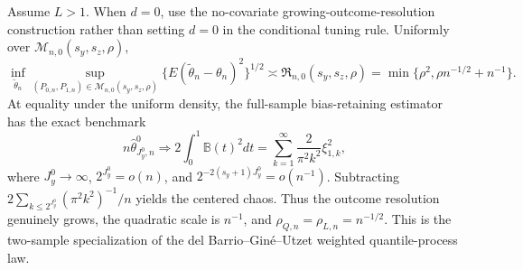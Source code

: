 Assume \(L>1\). When \(d=0\), use the no-covariate growing-outcome-resolution construction rather than setting \(d=0\) in the conditional tuning rule. Uniformly over \(\mathcal M_{n,0}(s_y,s_z,\rho)\),
\[
\inf_{\widetilde\theta_n}\sup_{(P_{0,n},P_{1,n})\in\mathcal M_{n,0}(s_y,s_z,\rho)}\{E(\widetilde\theta_n-\theta_n)^2\}^{1/2}\asymp\mathfrak R_{n,0}(s_y,s_z,\rho)=\min\{\rho^2,\rho n^{-1/2}+n^{-1}\}.
\]
At equality under the uniform density, the full-sample bias-retaining estimator has the exact benchmark
\[
n\widehat\theta^0_{J_y^0,n}\Rightarrow2\int_0^1\mathbb B(t)^2dt=\sum_{k=1}^{\infty}\frac{2}{\pi^2k^2}\xi_{1,k}^2,
\]
where \(J_y^0\to\infty\), \(2^{J_y^0}=o(n)\), and \(2^{-2(s_y+1)J_y^0}=o(n^{-1})\). Subtracting \(2\sum_{k\le2^{J_y^0}}(\pi^2k^2)^{-1}/n\) yields the centered chaos. Thus the outcome resolution genuinely grows, the quadratic scale is \(n^{-1}\), and \(\rho_{Q,n}=\rho_{L,n}=n^{-1/2}\). This is the two-sample specialization of the del Barrio--Gin\'e--Utzet weighted quantile-process law.